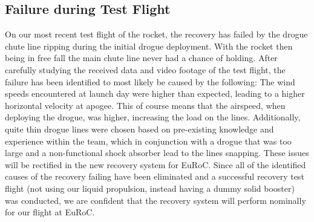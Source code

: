 \subsection{Failure during Test Flight}
On our most recent test flight of the rocket, the recovery has failed by the drogue chute line ripping during the initial drogue deployment. With the rocket then being in free fall the main chute line never had a chance of holding. After carefully studying the received data and video footage of the test flight, the failure has been identified to most likely be caused by the following: The wind speeds encountered at launch day were higher than expected, leading to a higher horizontal velocity at apogee. This of course means that the airspeed, when deploying the drogue, was higher, increasing the load on the lines. Additionally, quite thin drogue lines were chosen based on pre-existing knowledge and experience within the team, which in conjunction with a drogue that was too large and a non-functional shock absorber lead to the lines snapping.
These issues will be rectified in the new recovery system for EuRoC. Since all of the identified causes of the recovery failing have been eliminated and a successful recovery test flight (not using our liquid propulsion, instead having a dummy solid booster) was conducted, we are confident that the recovery system will perform nominally for our flight at EuRoC.